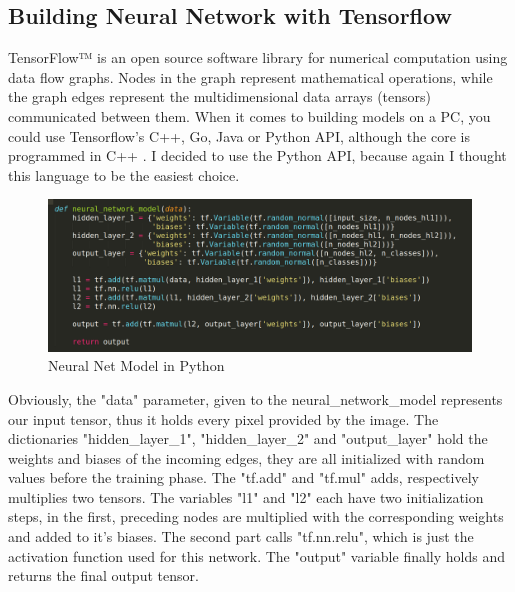 \subsection{Building Neural Network with Tensorflow}
TensorFlow™ is an open source software library for numerical computation using data flow graphs. Nodes in the graph represent mathematical operations, while the graph edges represent the multidimensional data arrays (tensors) communicated between them. \cite{tensorflow} When it comes to building models on a PC, you could use Tensorflow's C++, Go, Java or Python API, although the core is programmed in C++ \cite{tensorflowcore}. I decided to use the Python API, because again I thought this language to be the easiest choice. \newline
\begin{figure}[H]
	\centering
	\minipage{\textwidth}
	\includegraphics[width=\linewidth]{images/neuralnetmodelcode.png}
	\caption{Neural Net Model in Python}\label{fig:NNmodelPyth}
	\endminipage\hfill
\end{figure}

Obviously, the "data" parameter, given to the neural\_network\_model represents our input tensor, thus it holds every pixel provided by the image. The dictionaries "hidden\_layer\_1", "hidden\_layer\_2" and "output\_layer" hold the weights and biases of the incoming edges, they are all initialized with random values before the training phase. The "tf.add" and "tf.mul" adds, respectively multiplies two tensors. The variables "l1" and "l2" each have two initialization steps, in the first, preceding nodes are multiplied with the corresponding weights and added to it's biases. The second part calls "tf.nn.relu", which is just the activation function used for this network. The "output" variable finally holds and returns the final output tensor. 
